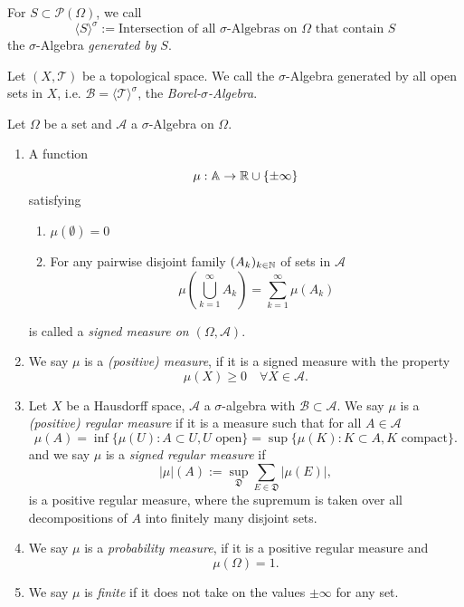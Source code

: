 \begin{definition}
	For $S\subset\mathcal{P}(\Omega)$, we call 
	\[
	\langle S\rangle^\sigma:=\text{Intersection of all $\sigma$-Algebras on $\Omega$ that contain $S$}
	\]
	the $\sigma$-Algebra \emph{generated by} $S$.
\end{definition}

\begin{definition}
	Let $(X,\mathcal{T})$ be a topological space. We call the $\sigma$-Algebra generated by all open sets in $X$, i.e. $\mathcal{B}=\langle \mathcal{T} \rangle^\sigma$, the \emph{Borel-$\sigma$-Algebra}.
\end{definition}


\begin{definition}Let $\Omega$ be a set and $\mathcal{A}$ a $\sigma$-Algebra on $\Omega$. 
\begin{enumerate}%
\item A function 
	\[
	\mu:\mathbb{A}\to \mathbb{R}\cup \{\pm\infty\}
	\]
	satisfying
	\begin{enumerate}
		\item $\mu(\emptyset)=0$
		\item For any pairwise disjoint family $(A_k)_{k\in\mathbb{N}}$  of sets in $\mathcal{A}$
		\[
		\mu\left(\bigcup_{k=1}^\infty A_k\right)=\sum_{k=1}^{\infty}\mu(A_k)
		\]	
	\end{enumerate}\enlargethispage{1cm}
is called a \emph{signed measure on $(\Omega,\mathcal{A})$}.

\item We say $\mu$ is a \emph{(positive) measure}, if it is a signed measure with the property 
\[
\mu(X)\geq 0\quad \forall X\in \mathcal{A}.
\]

\item Let $X$ be a Hausdorff space, $\mathcal{A}$ a $\sigma$-algebra with $\mathcal{B}\subset\mathcal{A}$.  We say $\mu$ is a \emph{(positive) regular measure} if it is a measure such that for all $A\in \mathcal{A}$
\[
\mu(A)=\inf\{\mu(U)\colon A\subset U, U \text{ open}\}=\sup\{\mu(K)\colon K\subset A, K\text{ compact} \}.
\] 
and we say $\mu$ is a \emph{signed regular measure} if 
\[
|\mu|(A):=\sup_{\mathfrak{D}}\sum_{E\in \mathfrak{D}}|\mu(E)|,
\]
is a positive regular measure, where the supremum is taken over all decompositions of $A$ into finitely many disjoint sets.

\item We say $\mu$ is a \emph{probability measure}, if it is a positive regular measure and
\[
\mu(\Omega)=1.
\]

\item We say $\mu$ is \emph{finite} if it does not take on the values $\pm\infty$ for any set.
\end{enumerate}
\end{definition}

